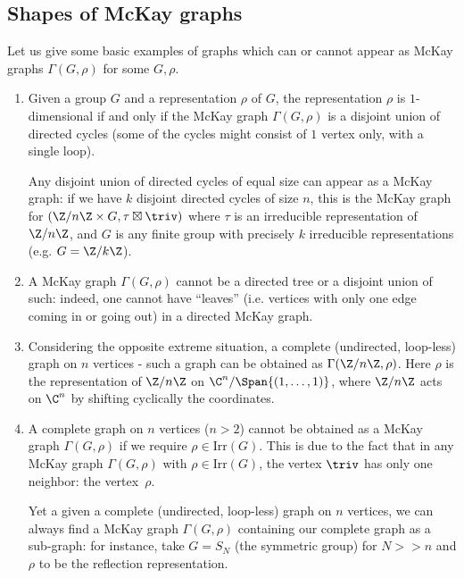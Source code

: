 \subsection{Shapes of McKay graphs} Let us give some basic examples of graphs which can or cannot appear as McKay 
graphs $\Gamma(G, \rho)$ for some $G, \rho$.
\begin{exam}
\begin{enumerate}
\item Given a group $G$ and a representation $\rho$ of $G$, the representation 
$\rho$ is $1$-dimensional if and only if the McKay graph $\Gamma(G, \rho)$ is a 
disjoint union of directed cycles (some of the cycles might consist 
of $1$ vertex only, with a single loop). 

Any disjoint union of directed cycles of equal size can appear as a McKay 
graph: 
if we have $k$ disjoint directed cycles of size $n$, this is the 
McKay graph for $(\Z/n\Z \times G, \tau\boxtimes \triv)$ where $\tau$ is an 
irreducible representation of $\Z/n\Z$, and $G$ is any finite group with 
precisely $k$ irreducible representations (e.g. $G=\Z/k\Z$).
 \item  A McKay graph $\Gamma(G, \rho)$ cannot be a directed tree or a 
disjoint union of such: indeed, one cannot have ``leaves'' (i.e. vertices with 
only one edge coming in or going out) in a directed McKay graph.
 \item Considering the opposite extreme situation, a complete (undirected, 
loop-less) graph on $n$ vertices - such a graph can be obtained as 
$\Gamma(\Z/n\Z, \rho)$. Here $\rho$ is the representation of $\Z/n\Z$ on 
$\C^n/\Span\{(1,\ldots, 1)\}$, where $\Z/n\Z$ acts on $\C^n$ by shifting cyclically the 
coordinates. 
 \item A complete graph on $n$ vertices ($n>2$) cannot be obtained as a McKay 
graph $\Gamma(G, \rho)$ if we require $\rho \in \mathrm{Irr}(G)$. This is due to the 
fact that in any McKay graph $\Gamma(G, \rho)$ with $\rho \in \mathrm{Irr}(G)$, the 
vertex $\triv$ has only one neighbor: the vertex~$\rho$.
 
 Yet a given a complete (undirected, loop-less) graph on $n$ vertices, we can 
always find a McKay graph $\Gamma(G, \rho)$  containing our complete graph as a 
sub-graph: for instance, take $G = S_N$ (the symmetric group) for $N>>n$ and 
$\rho$ to be the reflection representation.
\end{enumerate}

\end{exam}


